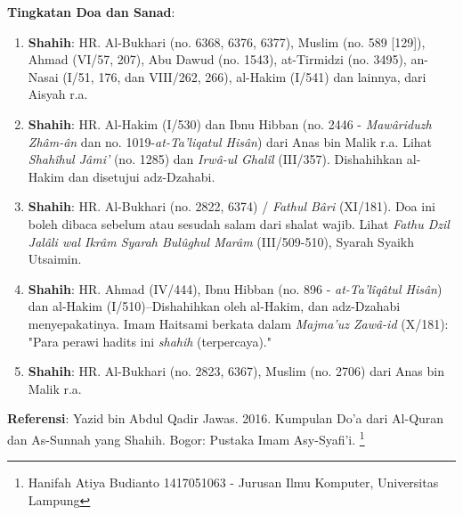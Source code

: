 \documentclass[a4paper,12pt]{article}
\begin{document}
\textbf{Tingkatan Doa dan Sanad}:
\begin{enumerate}
\item \textbf{Shahih}: HR. Al-Bukhari (no. 6368, 6376, 6377), Muslim (no. 
589 [129]), Ahmad (VI/57, 207), Abu Dawud (no. 1543), at-Tirmidzi (no. 
3495), an-Nasai (I/51, 176, dan VIII/262, 266), al-Hakim (I/541) dan 
lainnya, dari Aisyah r.a.
\item \textbf{Shahih}: HR. Al-Hakim (I/530) dan Ibnu Hibban (no. 2446 - 
\textit{Maw\^{a}riduzh Zh\^{a}m-\^{a}n} dan no. 1019-\textit{at-Ta'liqatul 
His\^{a}n}) dari Anas bin Malik r.a. Lihat \textit{Shah\^{i}hul J\^{a}mi'} 
(no. 1285) dan \textit{Irw\^{a}-ul Ghal\^{i}l} (III/357). Dishahihkan 
al-Hakim dan disetujui adz-Dzahabi.
\item \textbf{Shahih}: HR. Al-Bukhari (no. 2822, 6374) /
\textit{Fathul B\^{a}ri} (XI/181). Doa ini boleh dibaca sebelum atau 
sesudah salam dari shalat wajib. Lihat \textit{Fathu Dzil Jal\^{a}li wal 
Ikr\^{a}m Syarah Bul\^{u}ghul Mar\^{a}m} (III/509-510), Syarah Syaikh 
Utsaimin.
\item \textbf{Shahih}: HR. Ahmad (IV/444), Ibnu Hibban (no. 896 - 
\textit{at-Ta'l\^{i}q\^{a}tul His\^{a}n}) dan al-Hakim (I/510)--Dishahihkan
oleh al-Hakim, dan adz-Dzahabi menyepakatinya. Imam Haitsami berkata dalam 
\textit{Majma'uz Zaw\^{a}-id} (X/181): "Para perawi hadits ini 
\textit{shahih} (terpercaya)."
\item \textbf{Shahih}: HR. Al-Bukhari (no. 2823, 6367), Muslim (no. 2706) 
dari Anas bin Malik r.a.
\end{enumerate}
\textbf{Referensi}: Yazid bin Abdul Qadir Jawas. 2016. Kumpulan Do'a dari
Al-Quran dan As-Sunnah yang Shahih. Bogor: Pustaka Imam Asy-Syafi'i.
\footnote{Hanifah Atiya Budianto 1417051063 - Jurusan Ilmu Komputer,
Universitas Lampung}
\end{document}
